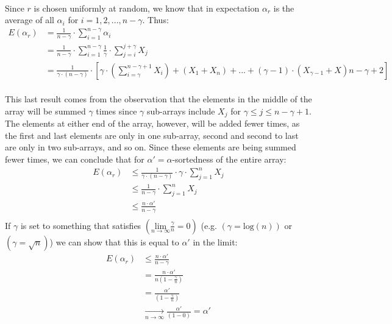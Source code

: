\documentclass{article}
\begin{document}
\paragraph{}Since $r$ is chosen uniformly at random, we know that in expectation $\alpha_{r}$ is the average of all $\alpha_{i}$ for $i = 1, 2, ..., n - \gamma$. Thus:
\begin{align*}
E(\alpha_{r}) &= \frac{1}{n - \gamma} \cdot \sum_{i = 1}^{n - \gamma}\alpha_{i} \\
&= \frac{1}{n - \gamma} \cdot \sum_{i = 1}^{n - \gamma} \frac{1}{\gamma} \cdot \sum_{j = i}^{j + \gamma}X_{j} \\
&= \frac{1}{\gamma \cdot (n - \gamma)} \cdot \left[ \gamma \cdot \left( \sum_{i=\gamma}^{n - \gamma + 1} X_{i} \right) + (X_{1} + X_{n}) + ... + (\gamma - 1) \cdot (X_{\gamma - 1} + X){n - \gamma + 2} \right]
\end{align*}
\paragraph{}This last result comes from the observation that the elements in the middle of the array will be summed $\gamma$ times since $\gamma$ sub-arrays include $X_{j}$ for $\gamma \leq j \leq n - \gamma + 1$. 
The elements at either end of the array, however, will be added fewer times, as the first and last elements are only in one sub-array, second and second to last are only in two sub-arrays, and so on. Since these elements are being summed fewer times, we can conclude that for $\alpha'=\alpha$-sortedness of the entire array:
\begin{align*}
E(\alpha_{r}) & \leq \frac{1}{\gamma \cdot (n - \gamma)} \cdot \gamma \cdot \sum_{j = 1}^{n} X_{j} \\
& \leq \frac{1}{n - \gamma} \cdot \sum_{j = 1}^{n} X_{j} \\
& \leq \frac{n \cdot \alpha'}{n - \gamma} \\
\end{align*}
If $\gamma$ is set to something that satisfies $(\underset{n\rightarrow\infty}{\text{lim}}\frac{\gamma}{n} = 0)$ (e.g. $(\gamma = \text{log}(n))$ or $(\gamma = \sqrt n)$) we can show that this is equal to $\alpha'$ in the limit:
\begin{align*}
E(\alpha_{r}) & \leq \frac{n \cdot \alpha'}{n - \gamma} \\
& = \frac{n \cdot \alpha'}{n(1-\frac{\gamma}{n})} \\
& = \frac{\alpha'}{(1-\frac{\gamma}{n})} \\
& \underset{n\rightarrow\infty}{\rightarrow} \frac{\alpha'}{(1-0)} = \alpha'
\end{align*}
\end{document}
